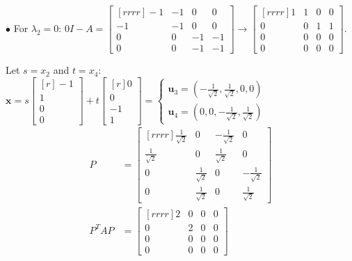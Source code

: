 \documentclass{article}
\newcommand\ddfrac[2]{\frac{\displaystyle #1}{\displaystyle #2}}
\begin{document}
        $\bullet$ For $ \lambda _2 = 0$: $0I - A = \begin{bmatrix}[rrrr]
            -1 & -1 & 0 & 0 \\
            -1 & -1 & 0 & 0 \\
            0 & 0 & -1 & -1 \\
            0 & 0 & -1 & -1 
        \end{bmatrix} \to \begin{bmatrix}[rrrr]
            1 & 1 & 0 & 0 \\
            0 & 0 & 1 & 1 \\
            0 & 0 & 0 & 0 \\
            0 & 0 & 0 & 0 
        \end{bmatrix} $.

        Let $s = x_2$ and $t = x_4$: $ \textbf{x} = s \begin{bmatrix}[r]
            -1 \\
            1 \\
            0 \\
            0 
        \end{bmatrix} + t \begin{bmatrix}[r]
            0 \\
            0 \\
            -1 \\
            1 
        \end{bmatrix} = \begin{cases}{}
            \textbf{u}_3 = \left( -\ddfrac{1}{\sqrt{2}} , \ddfrac{1}{\sqrt{2}} , 0, 0 \right) \\
            \textbf{u}_4 = \left( 0, 0, -\ddfrac{1}{\sqrt{2}} , \ddfrac{1}{\sqrt{2}}  \right) 
        \end{cases}$
        \begin{equation*}
            \begin{split}
                P &= \begin{bmatrix}[rrrr]
                    \ddfrac{1}{\sqrt{2}}  & 0 & -\ddfrac{1}{\sqrt{2}}  & 0 \\
                    \ddfrac{1}{\sqrt{2}}  & 0 & \ddfrac{1}{\sqrt{2}}  & 0 \\
                    0 & \ddfrac{1}{\sqrt{2}}  & 0 & -\ddfrac{1}{\sqrt{2}}  \\
                    0 & \ddfrac{1}{\sqrt{2}}  & 0 & \ddfrac{1}{\sqrt{2}} 
                \end{bmatrix}  \\
                    P^TAP &= \begin{bmatrix}[rrrr]
                        2 & 0 & 0 & 0 \\
                        0 & 2 & 0 & 0 \\
                        0 & 0 & 0 & 0 \\
                        0 & 0 & 0 & 0 
                    \end{bmatrix} 
            \end{split}
        \end{equation*}
 
\end{document}
